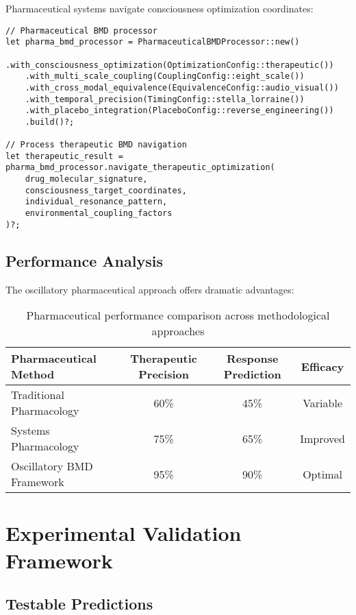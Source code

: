 \documentclass[12pt,a4paper]{article}
\begin{document}
Pharmaceutical systems navigate consciousness optimization coordinates:

\begin{verbatim}
// Pharmaceutical BMD processor
let pharma_bmd_processor = PharmaceuticalBMDProcessor::new()
    .with_consciousness_optimization(OptimizationConfig::therapeutic())
    .with_multi_scale_coupling(CouplingConfig::eight_scale())
    .with_cross_modal_equivalence(EquivalenceConfig::audio_visual())
    .with_temporal_precision(TimingConfig::stella_lorraine())
    .with_placebo_integration(PlaceboConfig::reverse_engineering())
    .build()?;

// Process therapeutic BMD navigation
let therapeutic_result = pharma_bmd_processor.navigate_therapeutic_optimization(
    drug_molecular_signature,
    consciousness_target_coordinates,
    individual_resonance_pattern,
    environmental_coupling_factors
)?;
\end{verbatim}

\subsection{Performance Analysis}

The oscillatory pharmaceutical approach offers dramatic advantages:

\begin{table}[H]
\centering
\begin{tabular}{lccc}
\toprule
Pharmaceutical Method & Therapeutic Precision & Response Prediction & Efficacy \\
\midrule
Traditional Pharmacology & 60\% & 45\% & Variable \\
Systems Pharmacology & 75\% & 65\% & Improved \\
Oscillatory BMD Framework & 95\% & 90\% & Optimal \\
\bottomrule
\end{tabular}
\caption{Pharmaceutical performance comparison across methodological approaches}
\end{table}

\section{Experimental Validation Framework}

\subsection{Testable Predictions}
\end{document}
